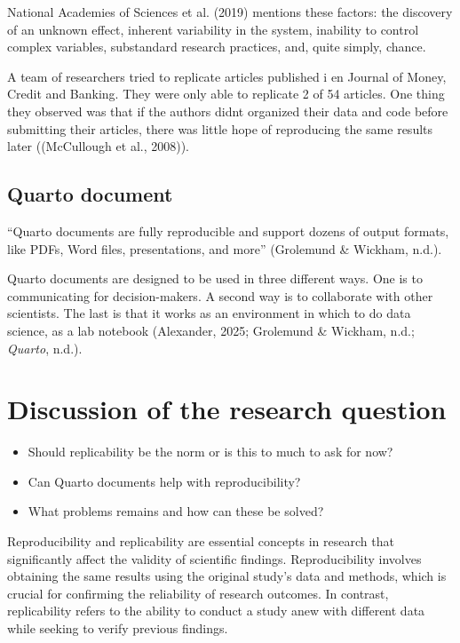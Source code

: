 \documentclass[
  a4paper,
]{article}
\providecommand{\tightlist}{%
  \setlength{\itemsep}{0pt}\setlength{\parskip}{0pt}}\usepackage{longtable,booktabs,array}
\begin{document}
National Academies of Sciences et al. (2019) mentions these factors: the
discovery of an unknown effect, inherent variability in the system,
inability to control complex variables, substandard research practices,
and, quite simply, chance.

A team of researchers tried to replicate articles published i en Journal
of Money, Credit and Banking. They were only able to replicate 2 of 54
articles. One thing they observed was that if the authors didnt
organized their data and code before submitting their articles, there
was little hope of reproducing the same results later ((McCullough et
al., 2008)).

\subsection{Quarto document}\label{quarto-document}

``Quarto documents are fully reproducible and support dozens of output
formats, like PDFs, Word files, presentations, and more'' (Grolemund \&
Wickham, n.d.).

Quarto documents are designed to be used in three different ways. One is
to communicating for decision-makers. A second way is to collaborate
with other scientists. The last is that it works as an environment in
which to do data science, as a lab notebook (Alexander, 2025; Grolemund
\& Wickham, n.d.; \emph{Quarto}, n.d.).

\section{Discussion of the research
question}\label{discussion-of-the-research-question}

\begin{itemize}
\tightlist
\item
  Should replicability be the norm or is this to much to ask for now?
\item
  Can Quarto documents help with reproducibility?
\item
  What problems remains and how can these be solved?
\end{itemize}

Reproducibility and replicability are essential concepts in research
that significantly affect the validity of scientific findings.
Reproducibility involves obtaining the same results using the original
study's data and methods, which is crucial for confirming the
reliability of research outcomes. In contrast, replicability refers to
the ability to conduct a study anew with different data while seeking to
verify previous findings.
\end{document}
